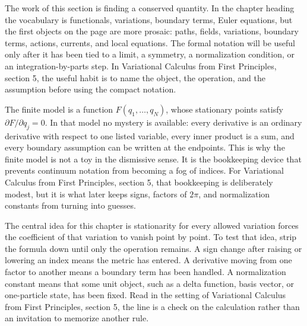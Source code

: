 











The work of this section is finding a conserved quantity.  In the chapter heading the vocabulary is functionals, variations, boundary terms, Euler equations, but the first objects on the page are more prosaic: paths, fields, variations, boundary terms, actions, currents, and local equations.  The formal notation will be useful only after it has been tied to a limit, a symmetry, a normalization condition, or an integration-by-parts step.  In Variational Calculus from First Principles, section 5, the useful habit is to name the object, the operation, and the assumption before using the compact notation.

The finite model is a function \(F(q_1,\ldots,q_N)\), whose stationary points satisfy \( \partial F/\partial q_j=0 \).  In that model no mystery is available: every derivative is an ordinary derivative with respect to one listed variable, every inner product is a sum, and every boundary assumption can be written at the endpoints.  This is why the finite model is not a toy in the dismissive sense.  It is the bookkeeping device that prevents continuum notation from becoming a fog of indices.  For Variational Calculus from First Principles, section 5, that bookkeeping is deliberately modest, but it is what later keeps signs, factors of \(2\pi\), and normalization constants from turning into guesses.

The central idea for this chapter is stationarity for every allowed variation forces the coefficient of that variation to vanish point by point.  To test that idea, strip the formula down until only the operation remains.  A sign change after raising or lowering an index means the metric has entered.  A derivative moving from one factor to another means a boundary term has been handled.  A normalization constant means that some unit object, such as a delta function, basis vector, or one-particle state, has been fixed.  Read in the setting of Variational Calculus from First Principles, section 5, the line is a check on the calculation rather than an invitation to memorize another rule.

